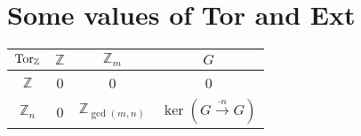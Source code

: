 \appendix
\chapter{Some values of Tor and Ext}

\begin{flushleft}
\begin{tabular}{ c | c c c }
    \(\operatorname{Tor}_{\mathbb{Z}}\) & \(\mathbb{Z} \) & \(\mathbb{Z}_m\) & \( G \) \\
    \hline
    \(\mathbb{Z} \) & 0 & 0 & 0 \\
    \(\mathbb{Z}_n \) & 0 & \(\mathbb{Z}_{\gcd (m,n)} \) & \(\ker (G \xrightarrow{\cdot n} G)\) \\
\end{tabular}
\end{flushleft}
